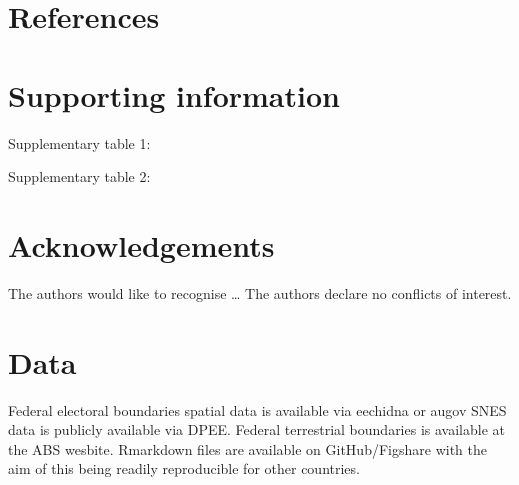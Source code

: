 \documentclass[a4paper,11pt]{article}
\begin{document}
\newpage
\nolinenumbers
\section{References}
\printbibliography

\newpage
\section{Supporting information}

Supplementary table 1:

Supplementary table 2:


\newpage
\section{Acknowledgements}
The authors would like to recognise \ldots
The authors declare no conflicts of interest.

\newpage
\section{Data}
Federal electoral boundaries spatial data is available via eechidna or augov
SNES data is publicly available via DPEE.
Federal terrestrial boundaries is available at the ABS wesbite.
Rmarkdown files are available on GitHub/Figshare with the aim of this being readily reproducible for other countries.
\end{document}
